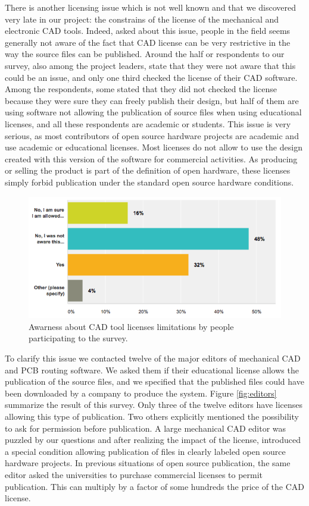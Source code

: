 \documentclass[letterpaper, 10 pt, conference]{ieeeconf}  %
\begin{document}
There is another licensing issue which is not well known and that we discovered very late in our project: the constrains of the license of the mechanical and electronic CAD tools. 
Indeed, asked about this issue, people in the field seems generally not aware of the fact that CAD license can be very restrictive in the way the source files can be published.
Around the half or respondents to our survey, also among the project leaders, state that they were not aware that this could be an issue, and only one third checked the license of their CAD software. 
Among the respondents, some stated that they did not checked the license because they were sure they can freely publish their design, but half of them are using software not allowing the publication of source files when using educational licenses, and all these respondents are academic or students.
This issue is very serious, as most contributors of open source hardware projects are academic and use academic or educational licenses. 
Most licenses do not allow to use the design created with this version of the software for commercial activities. 
As producing or selling the product is part of the definition of open hardware, these licenses simply forbid publication under the standard open source hardware conditions. 

\begin{figure}
\centering
\includegraphics[width=.9\columnwidth]{figures/aware-license}
\caption{Awarness about CAD tool licenses limitations by people participating to the survey.}
\label{fig:aware}
\end{figure}

To clarify this issue we contacted twelve of the major editors of mechanical CAD and PCB routing software.
We asked them if their educational license allows the publication of the source files, and we specified that the published files could have been downloaded by a company to produce the system.
Figure \ref{fig:editors} summarize the result of this survey.
Only three of the twelve editors have licenses allowing this type of publication. 
Two others explicitly mentioned the possibility to ask for permission before publication.
A large mechanical CAD editor was puzzled by our questions and after realizing the impact of the license, introduced a special condition allowing publication of files in clearly labeled open source hardware projects.
In previous situations of open source publication, the same editor asked the universities to purchase commercial licenses to permit publication.
This can multiply by a factor of some hundreds the price of the CAD license.
\end{document}
